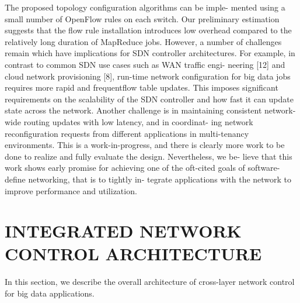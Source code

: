 \documentclass[runningheads,a4paper]{llncs}
\begin{document}
The proposed topology configuration algorithms can be imple- mented using a small number of OpenFlow rules on each switch. Our preliminary estimation suggests that the flow rule installation introduces low overhead compared to the relatively long duration of MapReduce jobs. However, a number of challenges remain which have implications for SDN controller architectures. For example, in contrast to common SDN use cases such as WAN traffic engi- neering [12] and cloud network provisioning [8], run-time network configuration for big data jobs requires more rapid and frequentflow table updates. This imposes significant requirements on the scalability of the SDN controller and how fast it can update state across the network. Another challenge is in maintaining consistent network-wide routing updates with low latency, and in coordinat- ing network reconfiguration requests from different applications in multi-tenancy environments.
This is a work-in-progress, and there is clearly more work to be done to realize and fully evaluate the design. Nevertheless, we be- lieve that this work shows early promise for achieving one of the oft-cited goals of software-define networking, that is to tightly in- tegrate applications with the network to improve performance and utilization.

\section{INTEGRATED NETWORK CONTROL ARCHITECTURE}
In this section, we describe the overall architecture of cross-layer network control for big data applications.
\end{document}
